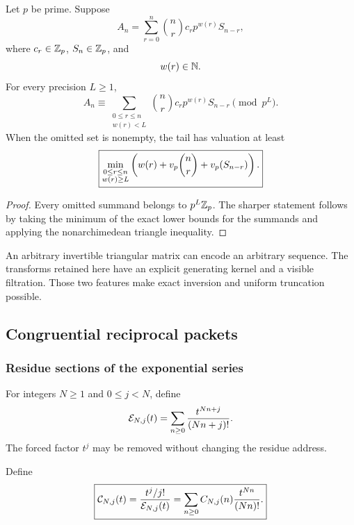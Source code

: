 \begin{histtheorem}\label{hist:thm:filtered_triangular_reconstruction}
Let \(p\) be prime. Suppose
\[
A_n
=
\sum_{r=0}^{n}
\binom nr
c_rp^{w(r)}S_{n-r},
\]
where \(c_r\in\mathbb Z_p\), \(S_n\in\mathbb Z_p\), and
\[
w(r)\in\mathbb N.
\]
For every precision \(L\geq1\),
\[
\boxed{
A_n
\equiv
\sum_{\substack{0\leq r\leq n\\w(r)<L}}
\binom nr
c_rp^{w(r)}S_{n-r}
\pmod {p^L}.
}
\]
When the omitted set is nonempty, the tail has valuation at least
\[
\boxed{
\min_{\substack{0\leq r\leq n\\w(r)\geq L}}
\left(
w(r)+v_p\binom nr+v_p(S_{n-r})
\right).
}
\]
\end{histtheorem}

\begin{proof}
Every omitted summand belongs to \(p^L\mathbb Z_p\). The sharper statement follows by taking the minimum of the exact lower bounds for the summands and applying the nonarchimedean triangle inequality.
\end{proof}

\begin{histremark}\label{hist:rem:triangular_freedom}
An arbitrary invertible triangular matrix can encode an arbitrary sequence. The transforms retained here have an explicit generating kernel and a visible filtration. Those two features make exact inversion and uniform truncation possible.
\end{histremark}

\subsection{Congruential reciprocal packets}\label{hist:sec:congruential}

\subsubsection{Residue sections of the exponential series}

For integers \(N\geq1\) and \(0\leq j<N\), define
\[
\mathcal E_{N,j}(t)
=
\sum_{n\geq0}
\frac{t^{Nn+j}}{(Nn+j)!}.
\]
The forced factor \(t^j\) may be removed without changing the residue address.

\begin{histdefinition}\label{hist:def:congruential_packet}
Define
\[
\boxed{
\mathcal C_{N,j}(t)
=
\frac{t^j/j!}{\mathcal E_{N,j}(t)}
=
\sum_{n\geq0}
C_{N,j}(n)
\frac{t^{Nn}}{(Nn)!}.
}
\]
\end{histdefinition}


